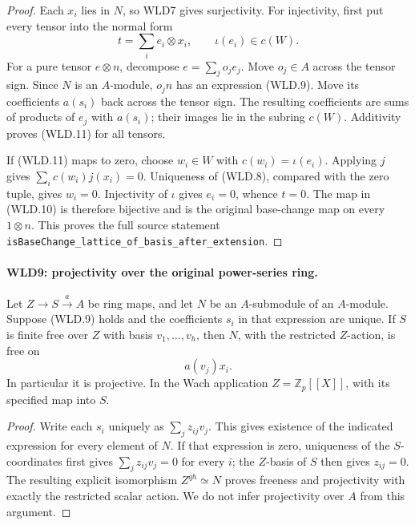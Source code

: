 \begin{proof}
Each $x_i$ lies in $N$, so WLD7 gives surjectivity.
For injectivity, first put every tensor into the normal form
\[
              t=\sum_i e_i\otimes x_i,\qquad
                                      \iota(e_i)\in c(W).
                                                               \tag{WLD.11}
\]
For a pure tensor $e\otimes n$, decompose $e=\sum_j o_je_j$.
Move $o_j\in A$ across the tensor sign. Since $N$ is an
$A$-module, $o_jn$ has an expression (WLD.9). Move its coefficients
$a(s_i)$ back across the tensor sign. The resulting coefficients
are sums of products of $e_j$ with $a(s_i)$; their images lie in
the subring $c(W)$. Additivity proves (WLD.11) for all tensors.

If (WLD.11) maps to zero, choose $w_i\in W$ with
$c(w_i)=\iota(e_i)$. Applying $j$ gives
$\sum_i c(w_i)j(x_i)=0$. Uniqueness of (WLD.8), compared with
the zero tuple, gives $w_i=0$. Injectivity of $\iota$ gives
$e_i=0$, whence $t=0$. The map in (WLD.10) is therefore bijective
and is the original base-change map on every $1\otimes n$.
This proves the full source statement
\texttt{is\allowbreak Base\allowbreak Change\_\allowbreak lattice\_\allowbreak of\_\allowbreak basis\_\allowbreak after\_\allowbreak extension}.
\end{proof}

\paragraph{WLD9: projectivity over the original power-series ring.}
\label{claim:WLD9}
Let $Z\to S\xrightarrow{a}A$ be ring maps, and let $N$ be an
$A$-submodule of an $A$-module. Suppose (WLD.9) holds and the
coefficients $s_i$ in that expression are unique. If
$S$ is finite free over $Z$ with basis $v_1,\ldots,v_h$, then
$N$, with the restricted $Z$-action, is free on
\[
                              a(v_j)x_i.
\]
In particular it is projective. In the Wach application
$Z=\mathbb Z_p[[X]]$, with its specified map into $S$.

\begin{proof}
Write each $s_i$ uniquely as $\sum_j z_{ij}v_j$.
This gives existence of the indicated expression for every element
of $N$. If that expression is zero, uniqueness of the $S$-coordinates
first gives $\sum_jz_{ij}v_j=0$ for every $i$; the $Z$-basis of $S$
then gives $z_{ij}=0$. The resulting explicit isomorphism
$Z^{qh}\simeq N$ proves freeness and projectivity with exactly the
restricted scalar action. We do not infer projectivity over $A$
from this argument.
\end{proof}

